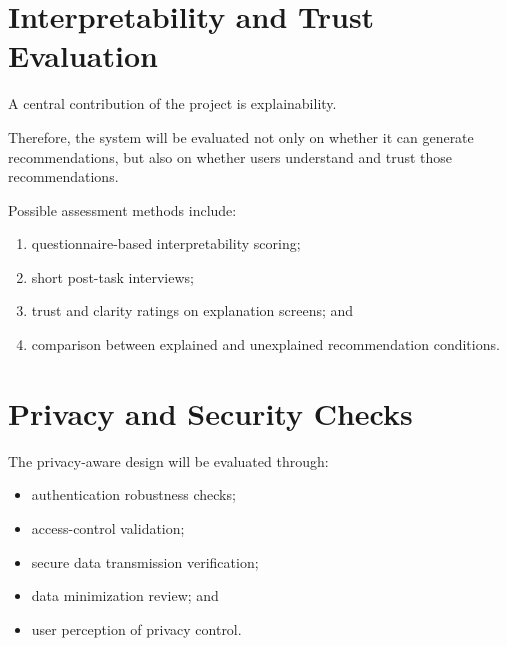 \documentclass[12pt,a4paper]{report}
\begin{document}
\section{Interpretability and Trust Evaluation}
A central contribution of the project is explainability.

Therefore,
the system will be evaluated not only on whether it can generate recommendations,
but also on whether users understand and trust those recommendations.

Possible assessment methods include:
\begin{enumerate}[label=\arabic*.]
\item questionnaire-based interpretability scoring;
\item short post-task interviews;
\item trust and clarity ratings on explanation screens;
and
\item comparison between explained and unexplained recommendation conditions.
\end{enumerate}

\section{Privacy and Security Checks}
The privacy-aware design will be evaluated through:
\begin{itemize}[leftmargin=2em]
\item authentication robustness checks;
\item access-control validation;
\item secure data transmission verification;
\item data minimization review;
and
\item user perception of privacy control.
\end{itemize}
\end{document}
